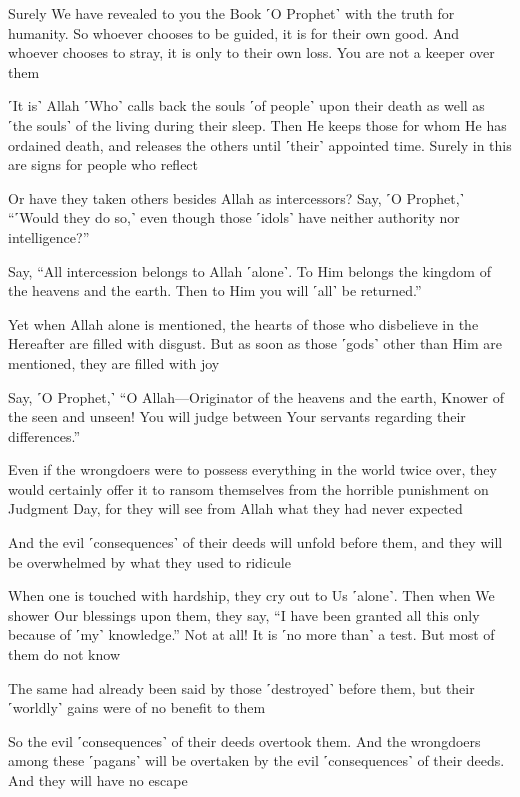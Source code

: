 Surely We have revealed to you the Book ˹O Prophet˺ with the truth for humanity. So whoever chooses to be guided, it is for their own good. And whoever chooses to stray, it is only to their own loss. You are not a keeper over them

˹It is˺ Allah ˹Who˺ calls back the souls ˹of people˺ upon their death as well as ˹the souls˺ of the living during their sleep. Then He keeps those for whom He has ordained death, and releases the others until ˹their˺ appointed time. Surely in this are signs for people who reflect

Or have they taken others besides Allah as intercessors? Say, ˹O Prophet,˺ “˹Would they do so,˺ even though those ˹idols˺ have neither authority nor intelligence?”

Say, “All intercession belongs to Allah ˹alone˺. To Him belongs the kingdom of the heavens and the earth. Then to Him you will ˹all˺ be returned.”

Yet when Allah alone is mentioned, the hearts of those who disbelieve in the Hereafter are filled with disgust. But as soon as those ˹gods˺ other than Him are mentioned, they are filled with joy

Say, ˹O Prophet,˺ “O Allah—Originator of the heavens and the earth, Knower of the seen and unseen! You will judge between Your servants regarding their differences.”

Even if the wrongdoers were to possess everything in the world twice over, they would certainly offer it to ransom themselves from the horrible punishment on Judgment Day, for they will see from Allah what they had never expected

And the evil ˹consequences˺ of their deeds will unfold before them, and they will be overwhelmed by what they used to ridicule

When one is touched with hardship, they cry out to Us ˹alone˺. Then when We shower Our blessings upon them, they say, “I have been granted all this only because of ˹my˺ knowledge.” Not at all! It is ˹no more than˺ a test. But most of them do not know

The same had already been said by those ˹destroyed˺ before them, but their ˹worldly˺ gains were of no benefit to them

So the evil ˹consequences˺ of their deeds overtook them. And the wrongdoers among these ˹pagans˺ will be overtaken by the evil ˹consequences˺ of their deeds. And they will have no escape

